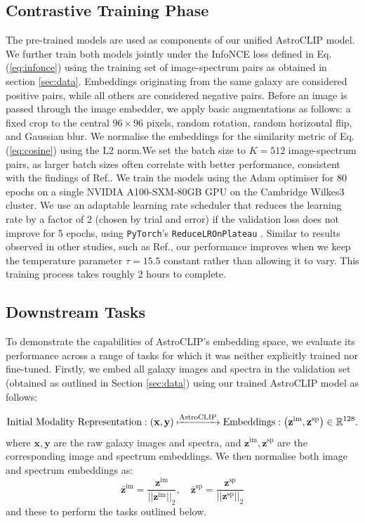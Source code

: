 \documentclass[a4paper,12pt]{article}
\begin{document}
\subsection{Contrastive Training Phase}
\label{sec:training}
The pre-trained models are used as components of our unified AstroCLIP model. We further train both models jointly under the InfoNCE loss defined in Eq.(\ref{eq:infonce}) using the training set of image-spectrum pairs as obtained in section \ref{sec:data}. Embeddings originating from the same galaxy are considered positive pairs, while all others are considered negative pairs. Before an image is passed through the image embedder, we apply basic augmentations as follows: a fixed crop to the central $96 \times 96$ pixels, random rotation, random horizontal flip, and Gaussian blur. We normalise the embeddings for the similarity metric of Eq.(\ref{eq:cosine}) using the L2 norm.We set the batch size to $K=512$ image-spectrum pairs, as larger batch sizes often correlate with better performance, consistent with the findings of Ref.\cite{radford2021learning}. We train the models using the Adam optimiser \cite{adam} for 80 epochs on a single NVIDIA A100-SXM-80GB GPU on the Cambridge Wilkes3 cluster. We use an adaptable learning rate scheduler that reduces the learning rate by a factor of 2 (chosen by trial and error) if the validation loss does not improve for 5 epochs, using \verb|PyTorch|'s \verb|ReduceLROnPlateau| \cite{LRon}. Similar to results observed in other studies, such as Ref.\cite{gir}, our performance improves when we keep the temperature parameter $\tau = 15.5$ constant rather than allowing it to vary. This training process takes roughly 2 hours to complete.

\subsection{Downstream Tasks}
\label{sec:downstream_tasks}
To demonstrate the capabilities of AstroCLIP's embedding space, we evaluate its performance across a range of tasks for which it was neither explicitly trained nor fine-tuned. Firstly, we embed all galaxy images and spectra in the validation set (obtained as outlined in Section \ref{sec:data}) using our trained AstroCLIP model as follows:

\begin{equation}
    \text{Initial Modality Representation} : \left( \mathbf{x}, \mathbf{y} \right) \xmapsto{\text{AstroCLIP}} \text{Embeddings} : \left( \mathbf{z}^{\text{im}}, \mathbf{z}^{\text{sp}} \right) \in \mathbb{R}^{128}.
\end{equation}
where $\mathbf{x}, \mathbf{y}$ are the raw galaxy images and spectra, and $\mathbf{z}^{\text{im}}, \mathbf{z}^{\text{sp}}$ are the corresponding image and spectrum embeddings. We then normalise both image and spectrum embeddings as:
\begin{equation}
    \mathbf{\bar{z}}^{\text{im}} =  \frac{\mathbf{z}^{\text{im}} }{|| \mathbf{z}^{\text{im}} ||_2}, \quad \mathbf{\bar{z}}^{\text{sp}} =  \frac{\mathbf{z}^{\text{sp}} }{|| \mathbf{z}^{\text{sp}} ||_2}
\end{equation}
and these to perform the tasks outlined below.
\end{document}
